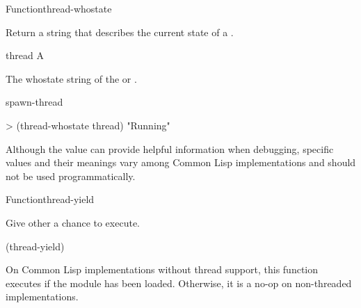 \documentclass[10pt,twoside,english,pdftex]{article}
\begin{document}
\begin{functiondoc}{Function}{thread-whostate}{
   \returns{} } 

\fnsyntax

\fnpurpose Return a string that describes the current state of a 
.

\fnpackage {}

\fnmodule {}

\fnargs
\begin{args}{thread}
\arg[thread] A 
\end{args}

\fnreturns The whostate string of the  or \nil.

\fnerrors
\nothreads{}

\begin{alsos}{spawn-thread}
\end{alsos}

\fnexample
\begin{example}
> (thread-whostate thread)
"Running"
\end{example}

\fnnotes Although the  value can provide helpful
information when debugging, specific  values and their
meanings vary among Common Lisp implementations and should not be used
programmatically.

\end{functiondoc}


\begin{functiondoc}{Function}{thread-yield}{\noargs{}}
%
%

\fnsyntax

\fnpurpose Give other  a chance to execute.

\fnpackage {}

\fnmodule {}

\fnexample
\begin{example}
  (thread-yield)
\end{example}

\fnnotes On Common Lisp implementations without thread support, this function
executes \textbf{} if the
 module has been loaded.  Otherwise, it is a no-op on
non-threaded implementations.

\end{functiondoc}
\end{document}
